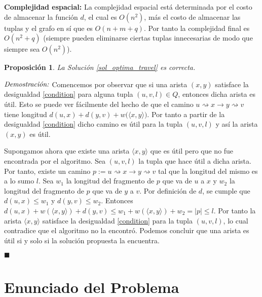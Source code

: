 \documentclass[10pt]{amsart}
\newtheorem{prop}[theorem]{Proposici\'on}
\theoremstyle{definition}
\numberwithin{equation}{section}
\newcommand{\lqqd}{{\small $\blacksquare$}}
\newcommand{\Proof}[2]{{\vspace{1em} $\emph{Demostración:}$ \textbf{#1} #2 \lqqd \vspace{1em}}}
\newcommand{\edge}[1]{\langle #1\rangle}
\begin{document}
\textbf{Complejidad espacial:}
	La complejidad espacial est\'a determinada por el costo de almacenar la funci\'on $d$, el cual es $O(n^2)$, m\'as el costo de almacenar las tuplas y el grafo en s\'i que es $O(n + m + q)$. Por tanto la complejidad final es $O(n^2 + q)$ (siempre pueden eliminarse ciertas tuplas innecesarias de modo que siempre sea $O(n^2)$).

\begin{prop}
	La Soluci\'on \ref{sol_optima_travel} es correcta.
\end{prop}
	\Proof{}{
		Comencemos por observar que si una arista $(x,y)$ satisface la desigualdad \eqref{condition} para alguna tupla $(u,v,l) \in Q$, entonces dicha arista es \'util. Esto se puede ver f\'acilmente del hecho de que el camino $u\rightsquigarrow x \rightarrow y\rightsquigarrow v$ tiene longitud $d(u,x) + d(y,v) + w\big( \edge{x,y} \big)$. Por tanto a partir de la desigualdad \eqref{condition} dicho camino es \'util para la tupla $(u,v,l)$ y as\'i la arista $(x,y)$ es \'util. 
		
		Supongamos ahora que existe una arista $\edge{x, y}$ que es \'util pero que no fue encontrada por el algoritmo. Sea $(u, v, l)$ la tupla que hace \'util a dicha arista. Por tanto, existe un camino $p := u \rightsquigarrow x \rightarrow y \rightsquigarrow v$ tal que la longitud del mismo es a lo sumo $l$. Sea $w_1$ la longitud del fragmento de $p$ que va de $u$ a $x$ y $w_2$ la longitud del fragmento de $p$ que va de $y$ a $v$. Por definici\'on de $d$, se cumple que $d(u,x) \le w_1$ y $d(y, v) \le w_2$. Entonces $d(u,x) + w(\edge{x, y}) + d(y , v) \le w_1 + w(\edge{x,y}) + w_2 = |p| \le l$. Por tanto la arista $\edge{x, y}$ satisface la desigualdad \eqref{condition} para la tupla $(u,v,l)$, lo cual contradice que el algoritmo no la encontr\'o. Podemos concluir que una arista es \'util si y solo si la soluci\'on propuesta la encuentra.
		
	}

\section{Enunciado del Problema}
	
\end{document}
